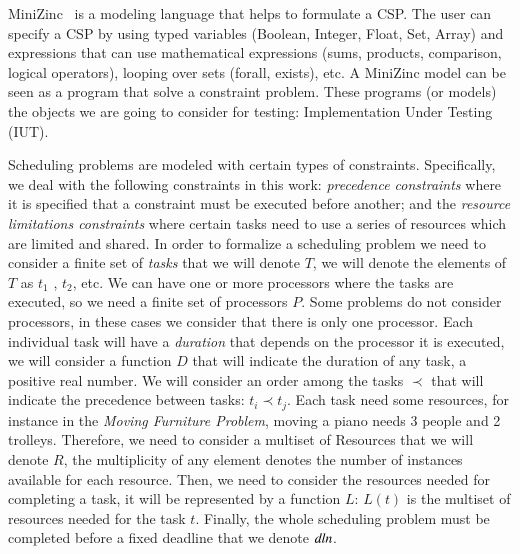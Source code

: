 MiniZinc~\cite{DBLP:journals/constraints/MarriottNRSBW08} is a modeling
language that helps to formulate a CSP. The user can specify a CSP by
using typed variables (Boolean, Integer, Float, Set, Array) and
expressions that can use mathematical expressions (sums, products,
comparison, logical operators), looping over sets (forall, exists), etc.
A MiniZinc model can be seen as a program that solve a constraint
problem. These programs (or models) the objects we are going to
consider for testing: Implementation Under Testing (IUT).

Scheduling problems are modeled with certain types of constraints.
Specifically, we deal with the following constraints in this work:
\textit{precedence constraints} where it is specified that a constraint
must be executed before another; and the \textit{resource
  limitations constraints} where certain tasks need to use a series of
resources which are limited and shared. In order to formalize a
scheduling problem we need to consider a finite set of \emph{tasks} that we will
denote $T$, we will denote the elements of $T$ as $t_{1}$ , $t_{2}$,
etc.
We can have one or more processors where the tasks are executed, so we
need a finite set of processors $P$. Some problems do not consider
processors, in these cases we consider that there is only one processor.
Each individual task will have a \emph{duration} that depends on the
processor it is executed, we will
consider a function $D$ that will indicate the duration of any task, a
positive real number.
We will consider an order among the tasks $\prec$ that
will indicate the precedence between tasks: $t_{i}\prec t_{j}$.
Each task need some resources, for instance in the \emph{Moving
  Furniture Problem}, moving a piano needs
3 people and 2 trolleys. Therefore, we need to consider a multiset of
Resources that we will denote $R$,
the multiplicity of any element denotes the number of
instances available for each resource. Then, we need to consider the
resources needed for completing a task, it will be represented by a
function $L$: $L(t)$ is the multiset of resources needed for the task
$t$. Finally, the whole scheduling problem must be completed before a
fixed deadline that we denote $\mathit{dln}$.

